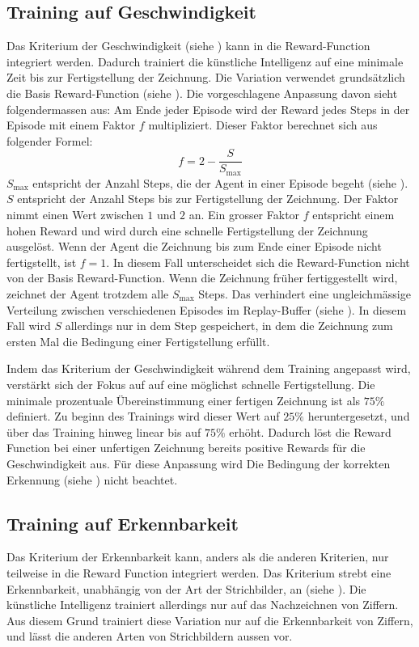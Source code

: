 \subsection{Training auf Geschwindigkeit}\label{sub:m_var_speed}
Das Kriterium der Geschwindigkeit (siehe ) kann in
die Reward-Function integriert werden. Dadurch trainiert die künstliche
Intelligenz auf eine minimale Zeit bis zur Fertigstellung der Zeichnung. Die
Variation verwendet grundsätzlich die Basis Reward-Function (siehe
). Die vorgeschlagene Anpassung davon sieht
folgendermassen aus: Am Ende jeder Episode wird der Reward jedes Steps in der
Episode mit einem Faktor $f$ multipliziert. Dieser Faktor berechnet sich aus
folgender Formel:
\[ f = 2 - \frac{S}{S_{\max}} \] 
$S_{\max}$ entspricht der Anzahl Steps, die der Agent in einer Episode begeht
(siehe ). $S$ entspricht der Anzahl Steps bis zur
Fertigstellung der Zeichnung. Der Faktor nimmt einen Wert zwischen $1$ und $2$
an. Ein grosser Faktor $f$ entspricht einem hohen Reward und wird durch eine
schnelle Fertigstellung der Zeichnung ausgelöst. Wenn der Agent die Zeichnung
bis zum Ende einer Episode nicht fertigstellt, ist $f = 1$. In diesem Fall unterscheidet sich die
Reward-Function nicht von der Basis Reward-Function. Wenn die Zeichnung früher
fertiggestellt wird, zeichnet der Agent trotzdem alle $S_{\max}$ Steps. Das
verhindert eine ungleichmässige Verteilung zwischen verschiedenen Episodes im
Replay-Buffer (siehe ). In diesem Fall wird $S$
allerdings nur in dem Step gespeichert, in dem die Zeichnung zum ersten Mal die
Bedingung einer Fertigstellung erfüllt.   

Indem das Kriterium der Geschwindigkeit während dem Training angepasst wird,
verstärkt sich der Fokus auf auf eine möglichst schnelle Fertigstellung. Die
minimale prozentuale Übereinstimmung einer fertigen Zeichnung ist als $75\%$
definiert. Zu beginn des Trainings wird dieser Wert auf $25\%$ heruntergesetzt,
und über das Training hinweg linear bis auf $75\%$ erhöht. Dadurch löst die
Reward Function bei einer unfertigen Zeichnung bereits positive Rewards für die
Geschwindigkeit aus. Für diese Anpassung wird Die Bedingung der korrekten
Erkennung (siehe ) nicht beachtet.


\subsection{Training auf Erkennbarkeit}\label{sub:m_var_rec}
Das Kriterium der Erkennbarkeit kann, anders als die anderen Kriterien, nur
teilweise in die Reward Function integriert werden. Das Kriterium strebt eine
Erkennbarkeit, unabhängig von der Art der Strichbilder, an (siehe
). Die künstliche Intelligenz trainiert allerdings nur
auf das Nachzeichnen von Ziffern. Aus diesem Grund trainiert diese Variation nur
auf die Erkennbarkeit von Ziffern, und lässt die anderen Arten von Strichbildern
aussen vor. 

